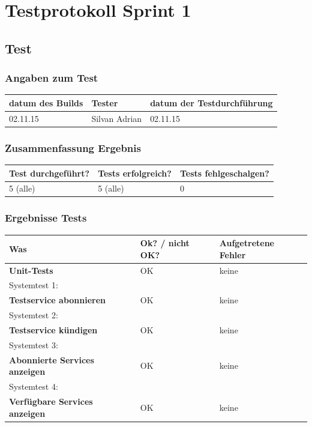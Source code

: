 \chapter{Testprotokoll Sprint 1}
\section{Test}
\subsection{Angaben zum Test}

\begin{tabularx}{\linewidth}{l l l}
\textbf{datum des Builds} & \textbf{Tester} & \textbf{datum der Testdurchführung}\\
\hline
02.11.15 & Silvan Adrian & 02.11.15

\end{tabularx}

\subsection{Zusammenfassung Ergebnis}
\begin{tabularx}{\linewidth}{l l l}
\textbf{Test durchgeführt?} & \textbf{Tests erfolgreich?} & \textbf{Tests fehlgeschalgen?}\\
\hline
5 (alle) & 5 (alle) & 0 \\
\hline
\end{tabularx}


\subsection{Ergebnisse Tests}
\begin{tabularx}{\linewidth}{l l l}
\textbf{Was} & \textbf{Ok? / nicht OK?} & \textbf{Aufgetretene Fehler}\\
\hline
\textbf{Unit-Tests} & {\color{green} OK}  & keine\\
\hline
Systemtest 1: & & \\
\textbf{Testservice abonnieren} & {\color{green} OK} & keine\\
\hline
Systemtest 2: & & \\
\textbf{Testservice kündigen} & {\color{green} OK}  & keine\\
\hline
Systemtest 3: & & \\
\textbf{Abonnierte Services anzeigen} & {\color{green} OK}  & keine\\
\hline
Systemtest 4: & & \\
\textbf{Verfügbare Services anzeigen} & {\color{green} OK}  & keine\\
\hline



\end{tabularx}

